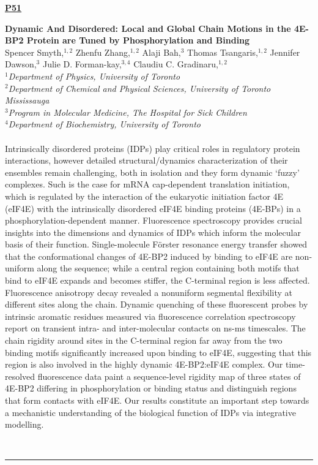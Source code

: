 \documentclass[titlepage,oneside,openany,10pt]{book}
\newenvironment{posterabs}[4] %
        {
	\begin{flushright}
                \underline{\textbf{#4}}
        \end{flushright}
        \textbf{#1}\\%
        #2\\%
        \textit{#3}\\\\%
        }
        {
        \\
        \noindent\rule{15cm}{0.5pt}%
        }
\begin{document}
\newpage

\begin{posterabs}
    {Dynamic And Disordered: Local and Global Chain Motions in the 4E-BP2 Protein are Tuned by Phosphorylation and Binding}
    {Spencer Smyth,$^{1,2}$ Zhenfu Zhang,$^{1,2}$ Alaji Bah,$^{3}$ Thomas Tsangaris,$^{1,2}$ Jennifer Dawson,$^{3}$ Julie D. Forman-kay,$^{3,4}$ Claudiu C. Gradinaru,$^{1,2}$}
    {
    $^1$Department of Physics, University of Toronto\\
    $^2$Department of Chemical and Physical Sciences, University of Toronto Mississauga\\
    $^3$Program in Molecular Medicine, The Hospital for Sick Children\\
    $^4$Department of Biochemistry, University of Toronto
    }
    {P51}
    Intrinsically disordered proteins (IDPs) play critical roles in regulatory protein interactions, however detailed structural/dynamics characterization of their ensembles remain challenging, both in isolation and they form dynamic `fuzzy' complexes. Such is the case for mRNA cap-dependent translation initiation, which is regulated by the interaction of the eukaryotic initiation factor 4E (eIF4E) with the intrinsically disordered eIF4E binding proteins (4E-BPs) in a phosphorylation-dependent manner. Fluorescence spectroscopy provides crucial insights into the dimensions and dynamics of IDPs which inform the molecular basis of their function. Single-molecule F\"{o}rster resonance energy transfer showed that the conformational changes of 4E-BP2 induced by binding to eIF4E are non-uniform along the sequence; while a central region containing both motifs that bind to eIF4E expands and becomes stiffer, the C-terminal region is less affected. Fluorescence anisotropy decay revealed a nonuniform segmental flexibility at different sites along the chain. Dynamic quenching of these fluorescent probes by intrinsic aromatic residues measured via fluorescence correlation spectroscopy report on transient intra- and inter-molecular contacts on ns-ms timescales. The chain rigidity around sites in the C-terminal region far away from the two binding motifs significantly increased upon binding to eIF4E, suggesting that this region is also involved in the highly dynamic 4E-BP2:eIF4E complex. Our time-resolved fluorescence data paint a sequence-level rigidity map of three states of 4E-BP2 differing in phosphorylation or binding status and distinguish regions that form contacts with eIF4E. Our results constitute an important step towards a mechanistic understanding of the biological function of IDPs via integrative modelling.
    \label{SmythS}
\end{posterabs}
\end{document}
